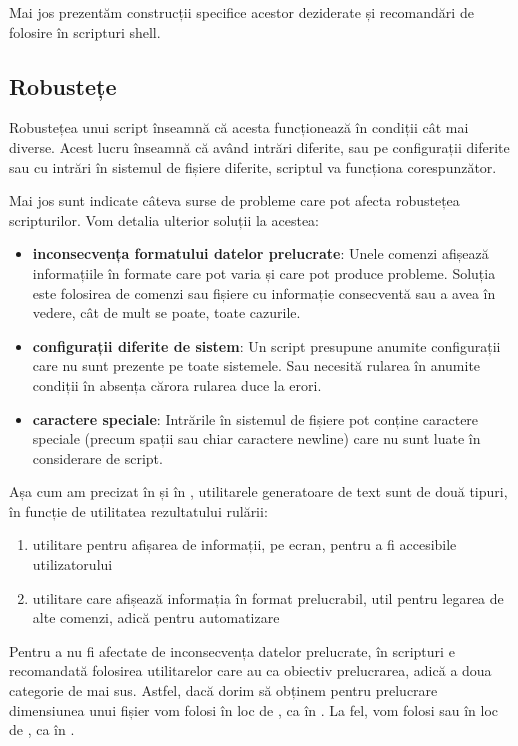Mai jos prezentăm construcții specifice acestor deziderate și recomandări de folosire în scripturi shell.

\subsection{Robustețe}
\label{sec:auto:script-advanced:robust}

Robustețea unui script înseamnă că acesta funcționează în condiții cât mai diverse.
Acest lucru înseamnă că având intrări diferite, sau pe configurații diferite sau cu intrări în sistemul de fișiere diferite, scriptul va funcționa corespunzător.

Mai jos sunt indicate câteva surse de probleme care pot afecta robustețea scripturilor.
Vom detalia ulterior soluții la acestea:

\begin{itemize}
  \item \textbf{inconsecvența formatului datelor prelucrate}:
    Unele comenzi afișează informațiile în formate care pot varia și care pot produce probleme.
    Soluția este folosirea de comenzi sau fișiere cu informație consecventă sau a avea în vedere, cât de mult se poate, toate cazurile.
  \item \textbf{configurații diferite de sistem}: Un script presupune anumite configurații care nu sunt prezente pe toate sistemele.
    Sau necesită rularea în anumite condiții în absența cărora rularea duce la erori.
  \item \textbf{caractere speciale}: Intrările în sistemul de fișiere pot conține caractere speciale (precum spații sau chiar caractere newline) care nu sunt luate în considerare de script.
\end{itemize}

Așa cum am precizat în  și în , utilitarele generatoare de text sunt de două tipuri, în funcție de utilitatea rezultatului rulării:

\begin{enumerate}
  \item utilitare pentru afișarea de informații, pe ecran, pentru a fi accesibile utilizatorului
  \item utilitare care afișează informația în format prelucrabil, util pentru legarea de alte comenzi, adică pentru automatizare
\end{enumerate}

Pentru a nu fi afectate de inconsecvența datelor prelucrate, în scripturi e recomandată folosirea utilitarelor care au ca obiectiv prelucrarea, adică a doua categorie de mai sus.
Astfel, dacă dorim să obținem pentru prelucrare dimensiunea unui fișier vom folosi  în loc de , ca în  .
La fel, vom folosi  sau  în loc de , ca în .

